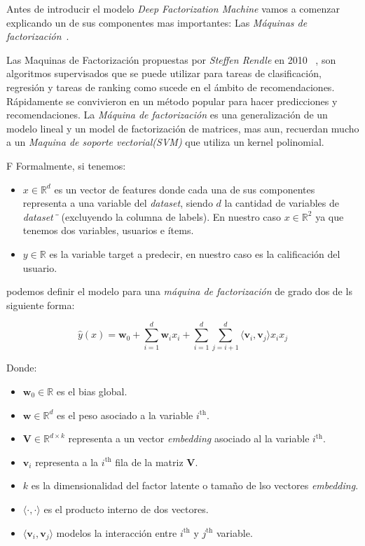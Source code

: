 \documentclass[11pt,a4paper,twoside]{thesis}
\begin{document}
Antes de introducir el modelo \textit{Deep Factorization Machine} vamos a
comenzar explicando un de sus componentes mas importantes: Las \textit{Máquinas
	de factorización}~\cite{didlfm, zhangdive}.

Las Maquinas de Factorización propuestas por \textit{Steffen Rendle} en 2010
~\cite{fm}, son algoritmos supervisados que se puede utilizar para tareas de
clasificación, regresión y tareas de ranking como sucede en el ámbito de
recomendaciones. Rápidamente se convivieron en un método popular para hacer
predicciones y recomendaciones. La \textit{Máquina de factorización} es una
generalización de un modelo lineal y un model de factorización de matrices, mas
aun, recuerdan mucho a un \textit{Maquina de soporte vectorial(SVM)} que
utiliza un kernel polinomial.

F Formalmente, si tenemos:

\begin{itemize}
	\item $x\in\mathbb{R}^{d}$ es un vector de features donde cada una de sus componentes representa a una variable del \textit{dataset}, siendo $d$ la cantidad de variables de \textit{dataset¨} (excluyendo la columna de labels). En nuestro caso $x\in\mathbb{R}^{2}$ ya que tenemos dos variables, usuarios e ítems.
	\item $y\in\mathbb{R}$ es la variable target a predecir, en nuestro caso es la calificación del usuario.
\end{itemize}

podemos definir el modelo para una \textit{máquina de factorización} de grado
dos de ls siguiente forma:

\begin{equation}
	\hat{y}(x) = \mathbf{w}_0 + \sum_{i=1}^d \mathbf{w}_i x_i + \sum_{i=1}^d\sum_{j=i+1}^d \langle\mathbf{v}_i, \mathbf{v}_j\rangle x_i x_j
\end{equation}
\begin{description}
	\item[Donde:]
\end{description}
\begin{itemize}
	\item $\mathbf{w}_0 \in \mathbb{R}$ es el bias global.
	\item $\mathbf{w} \in \mathbb{R}^d$ es el peso asociado a la variable $i^\mathrm{th}$.
	\item $\mathbf{V} \in \mathbb{R}^{d\times k}$ representa a un vector \textit{embedding} asociado al la variable $i^\mathrm{th}$.
	\item $\mathbf{v}_i$ representa a la $i^\mathrm{th}$ fila de la matriz $\mathbf{V}$.
	\item $k$ es la dimensionalidad del factor latente o tamaño de lso vectores \textit{embedding}.
	\item $\langle\cdot, \cdot \rangle$ es el producto interno de dos vectores.
	\item $\langle \mathbf{v}_i, \mathbf{v}_j \rangle$ modelos la interacción entre $i^\mathrm{th}$ y $j^\mathrm{th}$ variable.
\end{itemize}
\end{document}
